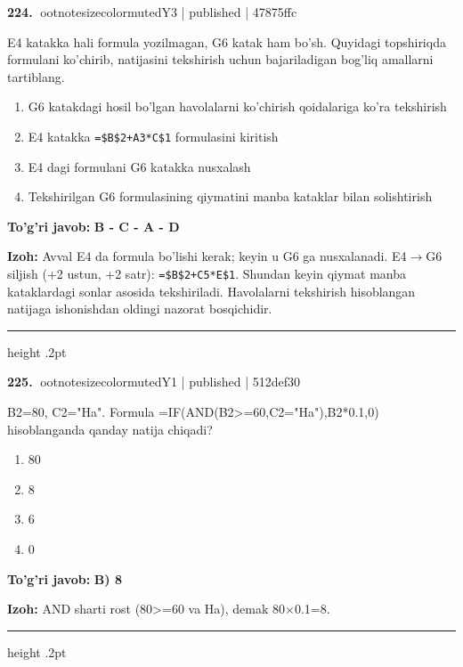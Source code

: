 \documentclass[10pt,a4paper]{article}
\begin{document}
\textbf{\color{ink}224.} {ootnotesizecolor{muted}Y3 | published | 47875ffc}
\par
E4 katakka hali formula yozilmagan, G6 katak ham bo'sh. Quyidagi topshiriqda formulani ko'chirib, natijasini tekshirish uchun bajariladigan bog'liq amallarni tartiblang.
\begin{enumerate}[label=\Alph*),leftmargin=9mm]
\item G6 katakdagi hosil bo'lgan havolalarni ko'chirish qoidalariga ko'ra tekshirish
\item E4 katakka \texttt{=\$B\$2+A3*C\$1} formulasini kiritish
\item E4 dagi formulani G6 katakka nusxalash
\item Tekshirilgan G6 formulasining qiymatini manba kataklar bilan solishtirish
\end{enumerate}
\begin{tcolorbox}[enhanced,breakable,colback=teal!4,colframe=teal!55!black,boxrule=0.45pt,arc=1.2mm,left=2.8mm,right=2.8mm,top=2mm,bottom=2mm]
\textbf{\color{teal}To'g'ri javob:} \textbf{B - C - A - D}
\par\smallskip
\textbf{Izoh:} Avval E4 da formula bo'lishi kerak; keyin u G6 ga nusxalanadi. E4\ensuremath{\rightarrow}G6 siljish (+2 ustun, +2 satr): \texttt{=\$B\$2+C5*E\$1}. Shundan keyin qiymat manba kataklardagi sonlar asosida tekshiriladi. Havolalarni tekshirish hisoblangan natijaga ishonishdan oldingi nazorat bosqichidir.
\end{tcolorbox}
\vspace{2mm}\hrule height .2pt\vspace{2mm}

\textbf{\color{ink}225.} {ootnotesizecolor{muted}Y1 | published | 512def30}
\par
B2=80, C2="Ha". Formula =IF(AND(B2\textgreater{}=60,C2="Ha"),B2*0.1,0) hisoblanganda qanday natija chiqadi?
\begin{enumerate}[label=\Alph*),leftmargin=9mm]
\item 80
\item 8
\item 6
\item 0
\end{enumerate}
\begin{tcolorbox}[enhanced,breakable,colback=teal!4,colframe=teal!55!black,boxrule=0.45pt,arc=1.2mm,left=2.8mm,right=2.8mm,top=2mm,bottom=2mm]
\textbf{\color{teal}To'g'ri javob:} \textbf{B) 8}
\par\smallskip
\textbf{Izoh:} AND sharti rost (80\textgreater{}=60 va Ha), demak 80\ensuremath{\times}0.1=8.
\end{tcolorbox}
\vspace{2mm}\hrule height .2pt\vspace{2mm}
\end{document}
